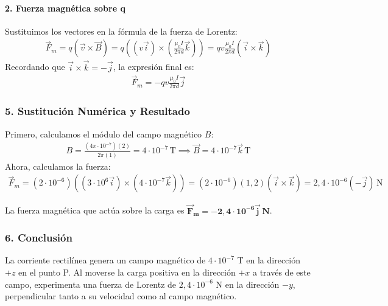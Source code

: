 \paragraph*{2. Fuerza magnética sobre q}
Sustituimos los vectores en la fórmula de la fuerza de Lorentz:
\begin{gather}
    \vec{F}_m = q (\vec{v} \times \vec{B}) = q \left( (v\vec{i}) \times \left(\frac{\mu_0 I}{2\pi d} \vec{k}\right) \right) = qv \frac{\mu_0 I}{2\pi d} (\vec{i} \times \vec{k})
\end{gather}
Recordando que $\vec{i} \times \vec{k} = -\vec{j}$, la expresión final es:
\begin{gather}
    \vec{F}_m = - qv \frac{\mu_0 I}{2\pi d} \vec{j}
\end{gather}

\subsubsection*{5. Sustitución Numérica y Resultado}
Primero, calculamos el módulo del campo magnético $B$:
\begin{gather}
    B = \frac{(4\pi \cdot 10^{-7})(2)}{2\pi (1)} = 4 \cdot 10^{-7} \, \text{T} \implies \vec{B} = 4 \cdot 10^{-7} \vec{k} \, \text{T}
\end{gather}
Ahora, calculamos la fuerza:
\begin{gather}
    \vec{F}_m = (2\cdot 10^{-6}) \left( (3\cdot 10^6 \vec{i}) \times (4\cdot 10^{-7} \vec{k}) \right) = (2\cdot 10^{-6}) (1,2) (\vec{i} \times \vec{k}) = 2,4 \cdot 10^{-6} (-\vec{j}) \, \text{N}
\end{gather}
\begin{cajaresultado}
La fuerza magnética que actúa sobre la carga es $\boldsymbol{\vec{F}_m = -2,4 \cdot 10^{-6} \vec{j} \, \textbf{N}}$.
\end{cajaresultado}

\subsubsection*{6. Conclusión}
\begin{cajaconclusion}
La corriente rectilínea genera un campo magnético de $4 \cdot 10^{-7}$ T en la dirección $+z$ en el punto P. Al moverse la carga positiva en la dirección $+x$ a través de este campo, experimenta una fuerza de Lorentz de $2,4 \cdot 10^{-6}$ N en la dirección $-y$, perpendicular tanto a su velocidad como al campo magnético.
\end{cajaconclusion}

